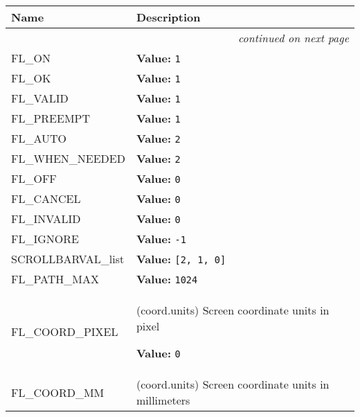     \vspace{-1cm}
\hspace{\varindent}\begin{longtable}{|p{\varnamewidth}|p{\vardescrwidth}|l}
\cline{1-2}
\cline{1-2} \centering \textbf{Name} & \centering \textbf{Description}& \\
\cline{1-2}
\endhead\cline{1-2}\multicolumn{3}{r}{\small\textit{continued on next page}}\\\endfoot\cline{1-2}
\endlastfoot\raggedright F\-L\-\_\-O\-N\- & \raggedright \textbf{Value:} 
{\tt 1}&\\
\cline{1-2}
\raggedright F\-L\-\_\-O\-K\- & \raggedright \textbf{Value:} 
{\tt 1}&\\
\cline{1-2}
\raggedright F\-L\-\_\-V\-A\-L\-I\-D\- & \raggedright \textbf{Value:} 
{\tt 1}&\\
\cline{1-2}
\raggedright F\-L\-\_\-P\-R\-E\-E\-M\-P\-T\- & \raggedright \textbf{Value:} 
{\tt 1}&\\
\cline{1-2}
\raggedright F\-L\-\_\-A\-U\-T\-O\- & \raggedright \textbf{Value:} 
{\tt 2}&\\
\cline{1-2}
\raggedright F\-L\-\_\-W\-H\-E\-N\-\_\-N\-E\-E\-D\-E\-D\- & \raggedright \textbf{Value:} 
{\tt 2}&\\
\cline{1-2}
\raggedright F\-L\-\_\-O\-F\-F\- & \raggedright \textbf{Value:} 
{\tt 0}&\\
\cline{1-2}
\raggedright F\-L\-\_\-C\-A\-N\-C\-E\-L\- & \raggedright \textbf{Value:} 
{\tt 0}&\\
\cline{1-2}
\raggedright F\-L\-\_\-I\-N\-V\-A\-L\-I\-D\- & \raggedright \textbf{Value:} 
{\tt 0}&\\
\cline{1-2}
\raggedright F\-L\-\_\-I\-G\-N\-O\-R\-E\- & \raggedright \textbf{Value:} 
{\tt -1}&\\
\cline{1-2}
\raggedright S\-C\-R\-O\-L\-L\-B\-A\-R\-V\-A\-L\-\_\-l\-i\-s\-t\- & \raggedright \textbf{Value:} 
{\tt \texttt{[}2\texttt{, }1\texttt{, }0\texttt{]}}&\\
\cline{1-2}
\raggedright F\-L\-\_\-P\-A\-T\-H\-\_\-M\-A\-X\- & \raggedright \textbf{Value:} 
{\tt 1024}&\\
\cline{1-2}
\raggedright F\-L\-\_\-C\-O\-O\-R\-D\-\_\-P\-I\-X\-E\-L\- & \raggedright (coord.units) Screen coordinate units in pixel

\textbf{Value:} 
{\tt 0}&\\
\cline{1-2}
\raggedright F\-L\-\_\-C\-O\-O\-R\-D\-\_\-M\-M\- & \raggedright (coord.units) Screen coordinate units in millimeters


\end{longtable}
